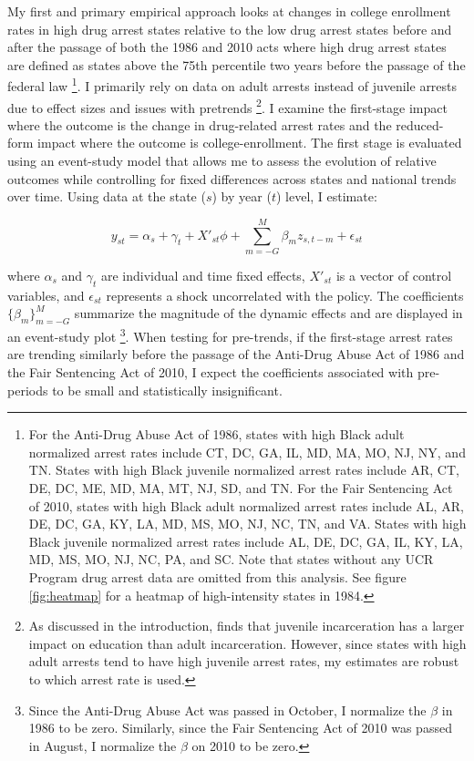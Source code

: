 \documentclass{article}
\begin{document}
My first and primary empirical approach looks at changes in college enrollment rates in high drug arrest states relative to the low drug arrest states before and after the passage of both the 1986 and 2010 acts where high drug arrest states are defined as states above the 75th percentile two years before the passage of the federal law \footnote{For the Anti-Drug Abuse Act of 1986, states with high Black adult normalized arrest rates include CT, DC, GA, IL, MD, MA, MO, NJ, NY, and TN. States with high Black juvenile normalized arrest rates include AR, CT, DE, DC, ME, MD, MA, MT, NJ, SD, and TN. For the Fair Sentencing Act of 2010, states with high Black adult normalized arrest rates include AL, AR, DE, DC, GA, KY, LA, MD, MS, MO, NJ, NC, TN, and VA. States with high Black juvenile normalized arrest rates include AL, DE, DC, GA, IL, KY, LA, MD, MS, MO, NJ, NC, PA, and SC. Note that states without any UCR Program drug arrest data are omitted from this analysis. See figure \ref{fig:heatmap} for a heatmap of high-intensity states in 1984.}. I primarily rely on data on adult arrests instead of juvenile arrests due to effect sizes and issues with pretrends \footnote{As discussed in the introduction, \cite{aizer} finds that juvenile incarceration has a larger impact on education than adult incarceration. However, since states with high adult arrests tend to have high juvenile arrest rates, my estimates are robust to which arrest rate is used.}. I examine the first-stage impact where the outcome is the change in drug-related arrest rates and the reduced-form impact where the outcome is college-enrollment. The first stage is evaluated using an event-study model that allows me to assess the evolution of relative outcomes while controlling for fixed differences across states and national trends over time. Using data at the state ($s$) by year ($t$) level, I estimate:

\begin{equation} \label{eq:state_level_es}
  y_{st} = \alpha_s + \gamma_t + X'_{st} \phi + \sum_{m=-G}^{M} \beta_m z_{s,t-m} + \epsilon_{st}
\end{equation}

where $\alpha_s$ and $\gamma_t$ are individual and time fixed effects, $X'_{st}$ is a vector of control variables, and $\epsilon_{st}$ represents a shock uncorrelated with the policy. The coefficients $\{\beta_m \}^{M}_{m=-G}$ summarize the magnitude of the dynamic effects and are displayed in an event-study plot \footnote{Since the Anti-Drug Abuse Act was passed in October, I normalize the $\beta$ in 1986 to be zero. Similarly, since the Fair Sentencing Act of 2010 was passed in August, I normalize the $\beta$ on 2010 to be zero.}. When testing for pre-trends, if the first-stage arrest rates are trending similarly before the passage of the Anti-Drug Abuse Act of 1986 and the Fair Sentencing Act of 2010, I expect the coefficients associated with pre-periods to be small and statistically insignificant.
\end{document}
